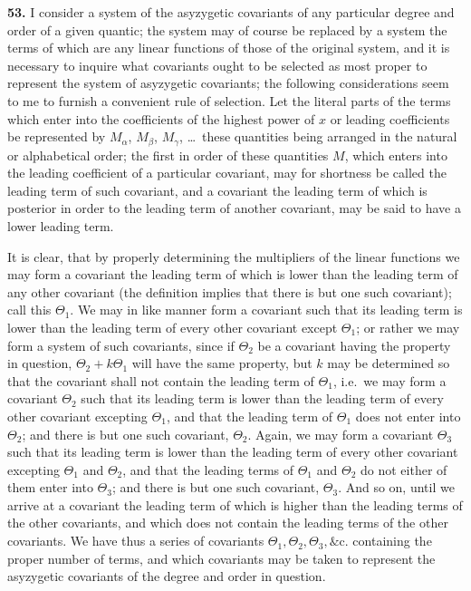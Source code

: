 \documentclass[11pt]{article}
\begin{document}
\textbf{53.} I consider a system of the asyzygetic covariants of any particular degree and order of a given quantic; the system may of course be replaced by a system the terms of which are any linear functions of those of the original system, and it is necessary to inquire what covariants ought to be selected as most proper to represent the system of asyzygetic covariants; the following considerations seem to me to furnish a convenient rule of selection. Let the literal parts of the terms which enter into the coefficients of the highest power of $x$ or leading coefficients be represented by $M_\alpha$, $M_\beta$, $M_\gamma$, \ldots\ these quantities being arranged in the natural or alphabetical order; the first in order of these quantities $M$, which enters into the leading coefficient of a particular covariant, may for shortness be called the leading term of such covariant, and a covariant the leading term of which is posterior in order to the leading term of another covariant, may be said to have a lower leading term.

It is clear, that by properly determining the multipliers of the linear functions we may form a covariant the leading term of which is lower than the leading term of any other covariant (the definition implies that there is but one such covariant); call this $\Theta_1$. We may in like manner form a covariant such that its leading term is lower than the leading term of every other covariant except $\Theta_1$; or rather we may form a system of such covariants, since if $\Theta_2$ be a covariant having the property in question, $\Theta_2 + k\Theta_1$ will have the same property, but $k$ may be determined so that the covariant shall not contain the leading term of $\Theta_1$, i.e.\ we may form a covariant $\Theta_2$ such that its leading term is lower than the leading term of every other covariant excepting $\Theta_1$, and that the leading term of $\Theta_1$ does not enter into $\Theta_2$; and there is but one such covariant, $\Theta_2$. Again, we may form a covariant $\Theta_3$ such that its leading term is lower than the leading term of every other covariant excepting $\Theta_1$ and $\Theta_2$, and that the leading terms of $\Theta_1$ and $\Theta_2$ do not either of them enter into $\Theta_3$; and there is but one such covariant, $\Theta_3$. And so on, until we arrive at a covariant the leading term of which is higher than the leading terms of the other covariants, and which does not contain the leading terms of the other covariants. We have thus a series of covariants $\Theta_1, \Theta_2, \Theta_3, \&\text{c.}$ containing the proper number of terms, and which covariants may be taken to represent the asyzygetic covariants of the degree and order in question.
\end{document}

